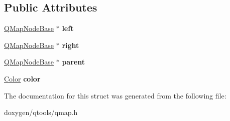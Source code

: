 \subsection*{Public Attributes}
\begin{DoxyCompactItemize}
\item 
\mbox{\label{struct_q_map_node_base_a5334085d1e9ededc044ea0b5551ed7fd}} 
\mbox{\hyperlink{struct_q_map_node_base}{Q\+Map\+Node\+Base}} $\ast$ {\bfseries left}
\item 
\mbox{\label{struct_q_map_node_base_a8eae5d979c668347872c31b956626a68}} 
\mbox{\hyperlink{struct_q_map_node_base}{Q\+Map\+Node\+Base}} $\ast$ {\bfseries right}
\item 
\mbox{\label{struct_q_map_node_base_a681ee5099626a90f1ecb5ae13ac168fd}} 
\mbox{\hyperlink{struct_q_map_node_base}{Q\+Map\+Node\+Base}} $\ast$ {\bfseries parent}
\item 
\mbox{\label{struct_q_map_node_base_a627d1bae805ea408334d5131362b8b60}} 
\mbox{\hyperlink{struct_color}{Color}} {\bfseries color}
\end{DoxyCompactItemize}


The documentation for this struct was generated from the following file\+:\begin{DoxyCompactItemize}
\item 
doxygen/qtools/qmap.\+h\end{DoxyCompactItemize}
